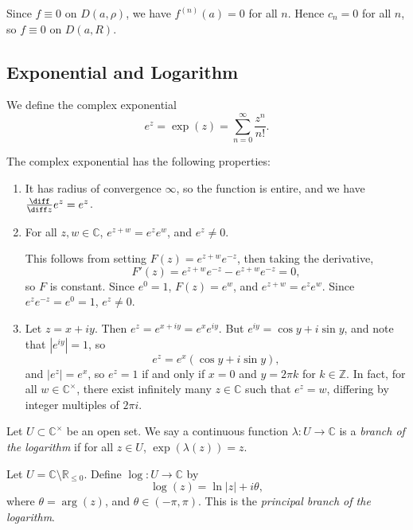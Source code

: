 \documentclass[12pt]{article}
\begin{document}
\begin{proofbox}
	Since $f \equiv 0$ on $D(a, \rho)$, we have $f^{(n)}(a) = 0$ for all $n$. Hence $c_n = 0$ for all $n$, so $f \equiv 0$ on $D(a, R)$.
\end{proofbox}

\subsection{Exponential and Logarithm}
\label{sub:exponential_and_logarithm}

We define the complex exponential
\[
e^{z} = \exp(z) = \sum_{n = 0}^{\infty} \frac{z^{n}}{n!}
.\]

The complex exponential has the following properties:
\begin{enumerate}[1.]
	\item It has radius of convergence $\infty$, so the function is entire, and we have $\frac{\diff}{\diff z} e^{z} = e^{z}$.
	\item For all $z, w \in \mathbb{C}$, $e^{z+w} = e^{z} e^{w}$, and $e^{z} \neq 0$.

		This follows from setting $F(z) = e^{z+w}e^{-z}$, then taking the derivative,
		\[
		F'(z) = e^{z+w}e^{-z} - e^{z+w}e^{-z} = 0
		,\]
		so $F$ is constant. Since $e^{0} = 1$, $F(z) = e^{w}$, and $e^{z+w} = e^{z}e^{w}$. Since $e^{z}e^{-z} = e^{0} = 1$, $e^{z} \neq 0$.
	\item Let $z = x + iy$. Then $e^{z} = e^{x + iy} = e^{x}e^{iy}$. But $e^{iy} = \cos y + i \sin y$, and note that $|e^{iy}| = 1$, so
		\[
		e^{z} = e^{x} (\cos y + i \sin y)
		,\]
		and $|e^{z}| = e^{x}$, so $e^{z} = 1$ if and only if $x = 0$ and $y = 2 \pi k$ for $k \in \mathbb{Z}$. In fact, for all $w \in \mathbb{C}^{\times}$, there exist infinitely many $z \in \mathbb{C}$ such that $e^{z} = w$, differing by integer multiples of $2 \pi i$.
\end{enumerate}

\begin{definition}
	Let $U \subset \mathbb{C}^{\times}$ be an open set. We say a continuous function $\lambda : U \to \mathbb{C}$ is a \emph{branch of the logarithm} if for all $z \in U$, $\exp(\lambda(z)) = z$.
\end{definition}

\begin{exbox}
	Let $U = \mathbb{C} \setminus \mathbb{R}_{\leq 0}$. Define $\log : U \to \mathbb{C}$ by
	\[
	\log(z) = \ln|z| + i \theta
	,\]
	where $\theta = \arg (z)$, and $\theta \in (-\pi, \pi)$. This is the \emph{principal branch of the logarithm}.
\end{exbox}
\end{document}
